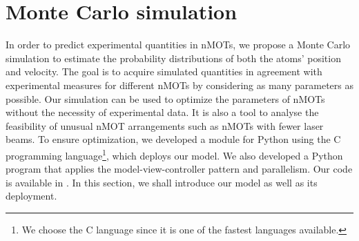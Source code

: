 %
\chapter{Monte Carlo simulation}
\label{ch:Monte-Carlo-simulation}
%

In order to predict experimental quantities in nMOTs, we propose a Monte Carlo simulation to estimate the probability distributions of both the atoms' position and velocity. The goal is to acquire simulated quantities in agreement with experimental measures for different nMOTs by considering as many parameters as possible. Our simulation can be used to optimize the parameters of nMOTs without the necessity of experimental data. It is also a tool to analyse the feasibility of unusual nMOT arrangements such as nMOTs with fewer laser beams. To ensure optimization, we developed a module for Python using the C programming language\footnote{We choose the C language since it is one of the fastest languages available.}, which deploys our model. We also developed a Python program that applies the model-view-controller pattern and parallelism. Our code is available in \cite{nMOT_sim}. In this section, we shall introduce our model as well as its deployment.


%


%
